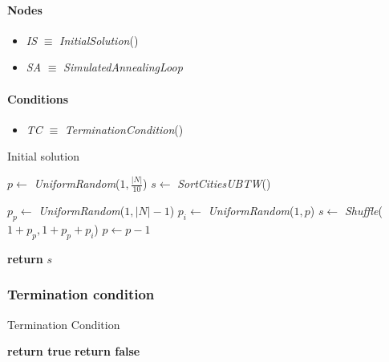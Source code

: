 \begin{homeworkProblem}
\begin{center}
\begin{minipage}{.45\textwidth}
\paragraph{Nodes}
\begin{itemize}
  \item \emph{IS} $\equiv$ \emph{InitialSolution}()
  \item \emph{SA} $\equiv$ \emph{SimulatedAnnealingLoop}
\end{itemize}
\paragraph{Conditions}
\begin{itemize}
  \item \emph{TC} $\equiv$ \emph{TerminationCondition}()
\end{itemize}
\end{minipage}
\end{center}



\begin{algorithm}
\caption{Initial solution}
\label{SA:Init}
\begin{algorithmic}

\State $p \gets$ \emph{UniformRandom}($1,\frac{|N|}{10}$) 
\State $s \gets$ \emph{SortCitiesUBTW}() 	

  \State $p_p \gets$ \emph{UniformRandom}($1,|N|-1$) 
  \State $p_i \gets$ \emph{UniformRandom}($1,p$) 
  \State $s \gets$ \emph{Shuffle}($1+p_p,1+p_p+p_i$) 
  \State $p \gets p-1$
\EndWhile	

\State \textbf{return} $s$

\EndProcedure    
\end{algorithmic}
\end{algorithm}

\subsubsection{Termination condition}
\begin{algorithm}[!h]
  \caption{Termination Condition}\label{SA:Term}
  \begin{algorithmic}[1]
				    \State \textbf{return true}
			    \EndIf
      \State \textbf{return false}
    \EndProcedure
\end{algorithmic}
\end{algorithm}


\end{homeworkProblem}
